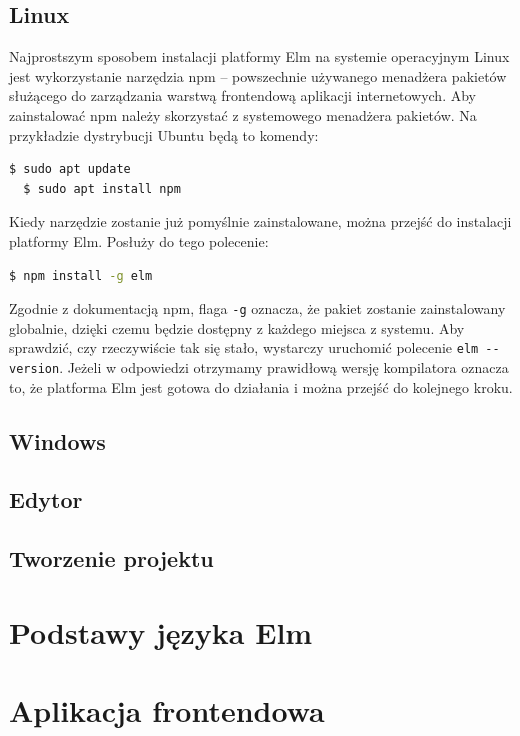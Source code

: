 \documentclass[twoside,a4paper]{report}
\begin{document}
\subsection{Linux}
Najprostszym sposobem instalacji platformy Elm na systemie operacyjnym Linux jest wykorzystanie narzędzia npm -- powszechnie używanego menadżera pakietów służącego do zarządzania warstwą frontendową aplikacji internetowych.
Aby zainstalować npm należy skorzystać z systemowego menadżera pakietów.
Na przykładzie dystrybucji Ubuntu będą to komendy:
\begin{lstlisting}[language=bash]
  $ sudo apt update
  $ sudo apt install npm
\end{lstlisting}
Kiedy narzędzie zostanie już pomyślnie zainstalowane, można przejść do instalacji platformy Elm.
Posłuży do tego polecenie:
\begin{lstlisting}[language=bash]
  $ npm install -g elm
\end{lstlisting}
Zgodnie z dokumentacją npm\cite{npmdocs}, flaga \verb|-g| oznacza, że pakiet zostanie zainstalowany globalnie, dzięki czemu będzie dostępny z każdego miejsca z systemu.
Aby sprawdzić, czy rzeczywiście tak się stało, wystarczy uruchomić polecenie \verb|elm --version|.
Jeżeli w odpowiedzi otrzymamy prawidłową wersję kompilatora oznacza to, że platforma Elm jest gotowa do działania i można przejść do kolejnego kroku.

\subsection{Windows}

\subsection{Edytor}

\subsection{Tworzenie projektu}

\section{Podstawy języka Elm}

\section{Aplikacja frontendowa}

\end{document}
